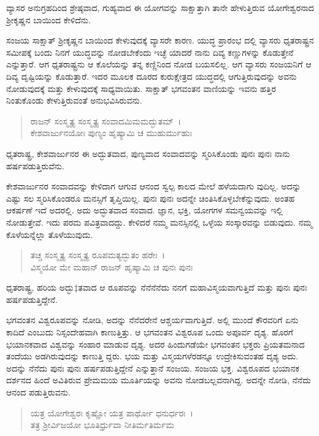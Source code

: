 {\small ವ್ಯಾಸರ ಅನುಗ್ರಹದಿಂದ ಶ್ರೇಷ್ಠವಾದ, ಗುಹ್ಯವಾದ ಈ ಯೋಗವನ್ನು ಸಾಕ್ಷಾತ್ತಾಗಿ ತಾನೇ ಹೇಳುತ್ತಿರುವ ಯೋಗೇಶ್ವರನಾದ ಶ‍್ರೀಕೃಷ್ಣನ ಬಾಯಿಂದ ಕೇಳಿದೆನು.}

ಸಂಜಯ ಸಾಕ್ಷಾತ್ ಶ‍್ರೀಕೃಷ್ಣನ ಬಾಯಿಂದ ಕೇಳುವುದಕ್ಕೆ ವ್ಯಾಸರೇ ಕಾರಣ. ಯುದ್ಧ ಪ್ರಾರಂಭ ದಲ್ಲಿ ವ್ಯಾಸರು ಧೃತರಾಷ್ಟ್ರನ ಸಮೀಪಕ್ಕೆ ಬಂದು ನಿನಗೆ ಯುದ್ಧವನ್ನು ನೋಡಬೇಕೆಂದು ಇಚ್ಛೆ ಯಾದರೆ ನಾನು ದಿವ್ಯ ಕಣ್ಣುಗಳನ್ನು ಕೊಡುತ್ತೇನೆ ಎನ್ನುತ್ತಾರೆ. ಆಗ ಧೃತರಾಷ್ಟ್ರನು ಆ ಕೊಲೆಯನ್ನು ತನ್ನ ಕಣ್ಣಿನಿಂದ ನೋಡ ಬಯಸಲಿಲ್ಲ. ಆಗ ವ್ಯಾಸರು ಸಂಜಯನಿಗೆ ಆ ದಿವ್ಯ ದೃಷ್ಟಿಯನ್ನು ಕೊಡುತ್ತಾರೆ. ಇದರ ಮೂಲಕ ದೂರದ ಕುರುಕ್ಷೇತ್ರದ ಯುದ್ಧದಲ್ಲಿ ಆಗುತ್ತಿರುವುದನ್ನು ಅವನು ನೋಡುವುದಕ್ಕೆ ಮತ್ತು ಕೇಳುವುದಕ್ಕೆ ಸಾಧ್ಯವಾಯಿತು. ಸಾಕ್ಷಾತ್ ಭಗವಂತನ ವಾಣಿಯನ್ನು ಇವನು ಹತ್ತಿರ ನಿಂತುಕೊಂಡು ಕೇಳುತ್ತಿರುವಂತೆ ಅನುಭವಿಸಿರುವನು.

\begin{verse}
ರಾಜನ್ ಸಂಸ್ಮೃತ್ಯ ಸಂಸ್ಮೃತ್ಯ ಸಂವಾದಮಿಮಮದ್ಭುತಮ್~।\\ಕೇಶವಾರ್ಜುನಯೋಃ ಪುಣ್ಯಂ ಹೃಷ್ಯಾಮಿ ಚ ಮುಹುರ್ಮುಹುಃ 
\end{verse}

{\small ಧೃತರಾಷ್ಟ್ರ, ಕೇಶವಾರ್ಜುನರ ಈ ಅದ್ಭುತವಾದ, ಪುಣ್ಯವಾದ ಸಂವಾದವನ್ನು ಸ್ಮರಿಸಿಕೊಂಡು ಪುನಃ ಪುನಃ ನಾನು ಹರ್ಷಪಡುತ್ತಿರುವೆನು.}

ಕೇಶವಾರ್ಜುನರ ಸಂವಾದವನ್ನು ಕೇಳಿದಾಗ ಆಗುವ ಆನಂದ ಸ್ವಲ್ಪ ಕಾಲದ ಮೇಲೆ ಹಳೆಯದಾಗು ವುದಿಲ್ಲ. ಅದನ್ನು ಎಷ್ಟು ಸಲ ಸ್ಮರಿಸಿಕೊಂಡರೂ ಮನಸ್ಸಿಗೆ ತೃಪ್ತಿಯಿಲ್ಲ. ಪುನಃ ಪುನಃ ಅದನ್ನೇ ಚಿಂತಿಸಿಕೊಳ್ಳಬೇಕೆನ್ನುವುದು. ಅಂತಹ ಆಕರ್ಷಣೆ ಇದೆ ಅದರಲ್ಲಿ. ಅದು ಅದ್ಭುತವಾದ ಸಂವಾದ. ಜ್ಞಾನ, ಭಕ್ತಿ, ಯೋಗಗಳ ಸಮನ್ವಯವನ್ನು ಇಲ್ಲಿ ನೋಡುತ್ತೇವೆ. ಇದು ಪರಮ ಪವಿತ್ರವಾದದ್ದು. ಕೇಳಿದರೆ ನಮ್ಮ ಮನಸ್ಸಿನಲ್ಲಿ ಒಳ್ಳೆಯ ಸಂಸ್ಕಾರವನ್ನು ಬಿಡುವುದು. ನಮ್ಮ ಕೊಳೆಯನ್ನೆಲ್ಲಾ ತೊಳೆಯುವುದು.

\begin{verse}
ತಚ್ಚ ಸಂಸ್ಮೃತ್ಯ ಸಂಸ್ಮೃತ್ಯ ರೂಪಮತ್ಯದ್ಭುತಂ ಹರೇಃ~।\\ವಿಸ್ಮಯೋ ಮೇ ಮಹಾನ್ ರಾಜನ್ ಹೃಷ್ಯಾಮಿ ಚ ಪುನಃ ಪುನಃ 
\end{verse}

{\small ಧೃತರಾಷ್ಟ್ರ, ಹರಿಯ ಅದ್ಭು‡ತವಾದ ಆ ರೂಪವನ್ನು ನೆನೆನೆನೆದು ನನಗೆ ಮಹಾವಿಸ್ಮಯವಾಗುತ್ತಿದೆ ಮತ್ತು ಪುನಃ ಪುನಃ ಹರ್ಷಪಡುತ್ತಿದ್ದೇನೆ.}

ಭಗವಂತನ ವಿಶ್ವರೂಪವನ್ನು ನೋಡಿ, ಅದನ್ನು ನೆನೆದರೇನೆ ಆಶ್ಚರ್ಯವಾಗುತ್ತಿದೆ. ಅಲ್ಲಿ ಮುಂದೆ ಕೌರವರಿಗೆ ಏನು ಕಾದಿದೆ ಎಂಬುದು ನಿಸ್ಸಂದೇಹವಾಗಿ ಕಾಣುತ್ತಿತ್ತು. ಆ ಭಗವಂತನ ವಿಶ್ವರೂಪ ಒಂದು ಅಪೂರ್ವ ದೃಶ್ಯ. ಹೊರಗೆ ಭಯಾನಕವಾದ ವಿಶ್ವವನ್ನು ಸಂಹಾರ ಮಾಡುವ ದೃಶ್ಯ. ಅದರ ಹಿಂದುಗಡೆಯೇ ಭಗವಂತನ ಭಕ್ತರು ಪ್ರಿಯತಮನಾದ ತಂದೆಯು ಅಡಗಿರುವುದನ್ನು ಕಾಣುತ್ತಿ ದ್ದರು. ಭಯ ಮತ್ತು ವಿಸ್ಮಯಗಳೆರಡನ್ನೂ ಉದ್ರೇಕಿಸುವಂತಹ ದೃಶ್ಯ ಅದು. ಅದನ್ನು ನೆನೆದು ಪುನಃ ಪುನಃ ಹರ್ಷಪಡುತ್ತಿದ್ದೇನೆ ಎನ್ನುತ್ತಾನೆ ಸಂಜಯ. ಸಂಜಯ ಭಕ್ತ. ವಿಶ್ವರೂಪದ ಭಯಾನಕ ದರ್ಶನದ ಹಿಂದೆ ಅವಿತಿರುವ ಪ್ರೇಮಮಯ ಮೂರ್ತಿಯನ್ನು ಅವನು ನೋಡಬಲ್ಲವನಾಗಿದ್ದ. ಅದನ್ನೇ ನೋಡಿ, ನೆನೆದು ಆನಂದ ಪಡುತ್ತಿರುವನು.

\begin{verse}
ಯತ್ರ ಯೋಗೇಶ್ವರಃ ಕೃಷ್ಣೋ ಯತ್ರ ಪಾರ್ಥೋ ಧನುರ್ಧರಃ~।\\ತತ್ರ ಶ‍್ರೀರ್ವಿಜಯೋ ಭೂತಿರ್ಧ್ರುವಾ ನೀತಿರ್ಮತಿರ್ಮಮ 
\end{verse}

